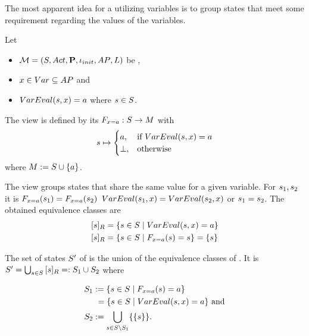 \documentclass[preview]{standalone}
\begin{document}
The most apparent idea for a \viewN utilizing variables is to group states that meet some requirement regarding the values of the variables.



\begin{definition}
	Let
	\begin{itemize}
		\item ${{{\mathcal{M}}}} = {{({S}, {Act}, {\textbf{P}}, {\iota_{init}}, {AP}, {L})}}$ be \chosengraphtypeN,
		\item ${x} \in {Var} \subseteq {AP}$ and 
		\item ${VarEval}({s}, {x}) = {a}$ where ${s} \in {S}$.		
	\end{itemize} 
	The view \viewparamvalueseq is defined by its \grpfctN ${{F_{{x} = {a}}}} : {S} \to {\ensuremath{{M}}}$ with
	\[
	{s} \mapsto
	\begin{cases}
		{a}, &\text{if } {VarEval}({s}, {x}) = {a}\\
		{\bot}, &\text{otherwise}
	\end{cases}
	\]
	where ${{M}} := {{S}} \cup \{a\}$.
\end{definition}

The view \viewparamvalueseq groups states that share the same value for a given variable. For ${s}_1, {s}_2$ it is ${{F_{{x} = {a}}}}({s}_1) = {{F_{{x} = {a}}}}({s}_2)$ \iffN ${VarEval}({s}_1, {x}) = {VarEval}({s}_2, {x})$ or ${s}_1 = {s}_2$. The obtained equivalence classes are
\begin{align*}
	{\ensuremath{{[{s}]_{{R}}}}} &= \{{s} \in {S} \mid {VarEval}({s}, {x}) = {a}\} \\
	{{[{s}]_{{R}}}} &= \{{s} \in {S} \mid {\ensuremath{{F_{{x} = {a}}}}}({s}) = {s}\} = \{{s}\}
\end{align*}

The set of states ${S}'$ of \viewparamvalueseq is the union of the equivalence classes of \eqrelview. It is ${S}' = \bigcup_{{s} \in {S}} {{[{s}]_{{R}}}} =: {S}_1 \cup {S}_2$ where

\begin{align*}
	{S}_1 &:= \{{s} \in {S} \mid {\ensuremath{{F_{{x} = {a}}}}}({s}) = {a}\} \\
	&\hspace{1.15mm}= \{{s} \in {S}  \mid {VarEval}({s}, {x}) = {a}\} \text{ and} \\
	{S}_2 &:= {\bigcup_{{s} \in {S} \setminus {S}_1}\{\{{s}\}\}}.
\end{align*}
\end{document}
